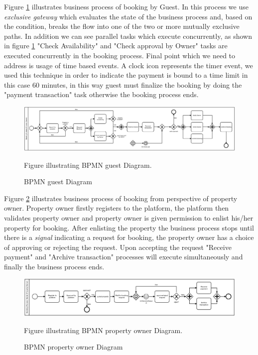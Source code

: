 Figure \ref{fig:bpm_guest_model} illustrates business process of booking by Guest. 
In this process we use \textit{exclusive gateway} which evaluates the state of the business process and, based on the condition, breaks the flow into one of the two or more mutually exclusive paths.
In addition we can see parallel tasks which execute concurrently, as shown in figure \ref{fig:bpm_guest_model} "Check Availability" and "Check approval by Owner" tasks are executed concurrently in the booking process.
Final point which we need to address is usage of time based events. A clock icon represents the timer event, we used this technique in order to indicate the payment is bound to a time limit in this case 60 minutes, in this way guest must finalize the booking by doing the "payment transaction" task otherwise the booking process ends. 

\begin{figure} 
\centering
\includegraphics[width=14cm]{pictures/BPMN_guest.png}
\caption{BPMN guest Diagram}
Figure illustrating BPMN guest Diagram.
\label{fig:bpm_guest_model}
\end{figure}



 Figure \ref{fig:bpm_owner_model} illustrates business process of booking from perspective of property owner. Property owner firstly registers to the platform, the platform then validates property owner and property owner is given permission to enlist his/her property for booking. After enlisting the property the business process stops until there is a \textit{signal} indicating a request for booking, the property owner has a choice of approving or rejecting the request. Upon accepting the request "Receive payment" and "Archive transaction" processes will execute simultaneously and finally the business process ends. 

\begin{figure} 
\centering
\includegraphics[width=14cm]{pictures/BPMN_property_owner.png}
\caption{BPMN property owner Diagram}
Figure illustrating BPMN property owner Diagram.
\label{fig:bpm_owner_model}
\end{figure}


